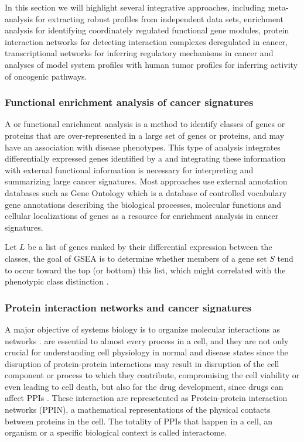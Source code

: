 In this section we will highlight several integrative  approaches, including meta-analysis for extracting robust profiles from independent data sets, enrichment analysis for identifying coordinately regulated functional gene modules, protein interaction networks for detecting interaction complexes deregulated in cancer, transcriptional networks for inferring regulatory mechanisms in cancer and analyses of model system profiles with human tumor profiles for inferring activity of oncogenic pathways.

\subsubsection{Functional enrichment analysis of cancer signatures}

A  or  functional enrichment analysis is a method to identify classes of genes or proteins that are over-represented in a large set of genes or proteins, and may have an association with disease phenotypes.
This type of analysis integrates  differentially expressed genes identified by a   and integrating these information with external functional information is necessary for interpreting and summarizing large cancer signatures.
Most approaches use external annotation databases such as Gene Ontology which is a database of controlled vocabulary gene annotations describing the biological processes, molecular functions and cellular localizations of genes as a resource for enrichment analysis in cancer signatures.

Let $L$ be a  list of genes ranked by their differential expression between the classes, the goal of GSEA is to determine whether members of a gene set $S$ tend to occur toward the top (or bottom) this list,  which might correlated with the phenotypic class
distinction \cite{subramanian2005gene}.

\subsubsection{Protein interaction networks and cancer signatures}

A major objective of systems biology is to organize molecular interactions as networks \cite{vinayagam2014integrating}.  are essential to almost every process in a cell, and they are not only crucial for understanding cell physiology in normal and disease states since the disruption of protein-protein interactions may result in disruption of the cell component or process to which they contribute, compromising the cell viability or even leading to cell death, but also for the drug development, since drugs can affect PPIs \cite{PPIs,alzate2009neuroproteomics}.
These interaction are represetented as Protein-protein interaction networks (PPIN), a mathematical representations of the physical contacts between proteins in the cell.
The totality of PPIs that happen in a cell, an organism or a specific biological context is called interactome.

